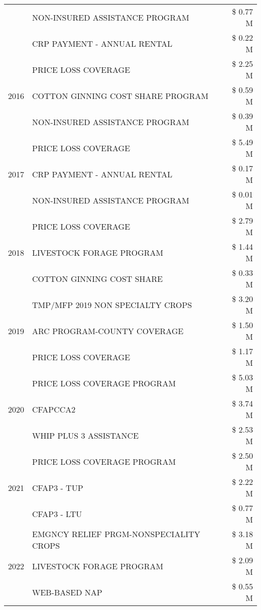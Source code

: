 \begin{tabular}{llr}
 & NON-INSURED ASSISTANCE PROGRAM & \$ 0.77 M \\
 & CRP PAYMENT - ANNUAL RENTAL & \$ 0.22 M \\
\cline{1-3}
\multirow[t]{3}{*}{2016} & PRICE LOSS COVERAGE & \$ 2.25 M \\
 & COTTON GINNING COST SHARE PROGRAM & \$ 0.59 M \\
 & NON-INSURED ASSISTANCE PROGRAM & \$ 0.39 M \\
\cline{1-3}
\multirow[t]{3}{*}{2017} & PRICE LOSS COVERAGE & \$ 5.49 M \\
 & CRP PAYMENT - ANNUAL RENTAL & \$ 0.17 M \\
 & NON-INSURED ASSISTANCE PROGRAM & \$ 0.01 M \\
\cline{1-3}
\multirow[t]{3}{*}{2018} & PRICE LOSS COVERAGE & \$ 2.79 M \\
 & LIVESTOCK FORAGE PROGRAM & \$ 1.44 M \\
 & COTTON GINNING COST SHARE & \$ 0.33 M \\
\cline{1-3}
\multirow[t]{3}{*}{2019} & TMP/MFP 2019 NON SPECIALTY CROPS & \$ 3.20 M \\
 & ARC PROGRAM-COUNTY COVERAGE & \$ 1.50 M \\
 & PRICE LOSS COVERAGE & \$ 1.17 M \\
\cline{1-3}
\multirow[t]{3}{*}{2020} & PRICE LOSS COVERAGE PROGRAM & \$ 5.03 M \\
 & CFAPCCA2 & \$ 3.74 M \\
 & WHIP PLUS 3 ASSISTANCE & \$ 2.53 M \\
\cline{1-3}
\multirow[t]{3}{*}{2021} & PRICE LOSS COVERAGE PROGRAM & \$ 2.50 M \\
 & CFAP3 - TUP & \$ 2.22 M \\
 & CFAP3 - LTU & \$ 0.77 M \\
\cline{1-3}
\multirow[t]{3}{*}{2022} & EMGNCY RELIEF PRGM-NONSPECIALITY CROPS & \$ 3.18 M \\
 & LIVESTOCK FORAGE PROGRAM & \$ 2.09 M \\
 & WEB-BASED NAP & \$ 0.55 M \\
\cline{1-3}
\bottomrule
\end{tabular}
